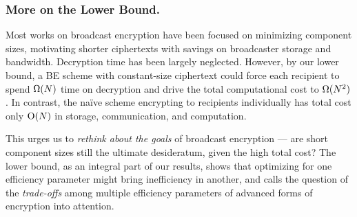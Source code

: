 \subsubsection{More on the Lower Bound.}
Most works on broadcast encryption have been focused on minimizing component sizes,
motivating shorter ciphertexts with savings on broadcaster storage and bandwidth.
Decryption time has been largely neglected.
However, by our lower bound, a BE scheme with constant-size ciphertext
could force each recipient to spend $\operatorname{\Omega}(N)$ time on decryption and
drive the total computational cost to $\operatorname{\Omega}(N^2)$.
In contrast, the na{\"i}ve scheme encrypting to recipients individually
has total cost only $\operatorname{O}(N)$ in storage, communication, and computation.

This urges us to \emph{rethink about the goals} of broadcast encryption
---
are short component sizes still the ultimate desideratum,
given the high total cost?
The lower bound, as an integral part of our results,
shows that optimizing for one efficiency parameter
might bring inefficiency in another, and
calls the question of
the \emph{trade-offs} among multiple efficiency parameters
of advanced forms of encryption
into attention.

